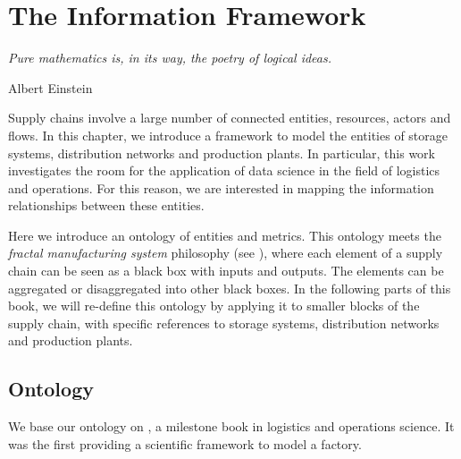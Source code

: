 \chapter{The Information Framework} \label{chap_InformationFramework}

\epigraph{\textit{Pure mathematics is, in its way, the poetry of logical ideas.}}{Albert Einstein}


Supply chains involve a large number of connected entities, resources, actors and flows.  In this chapter, we introduce a framework to model the entities of storage systems, distribution networks and production plants. In particular, this work investigates the room for the application of data science in the field of logistics and operations. For this reason, we are interested in mapping the information relationships between these entities.\par

Here we introduce an ontology of entities and metrics. This ontology meets the \textit{fractal manufacturing system} philosophy (see \cite{Sprock2018}), where each element of a supply chain can be seen as a black box with inputs and outputs. The elements can be aggregated or disaggregated into other black boxes. In the following parts of this book, we will re-define this ontology by applying it to smaller blocks of the supply chain, with specific references to storage systems, distribution networks and production plants.

\section{Ontology}\label{secOntology}
We base our ontology on \cite{Hopp2011}, a milestone book in logistics and operations science. It was the first providing a scientific framework to model a factory. 

